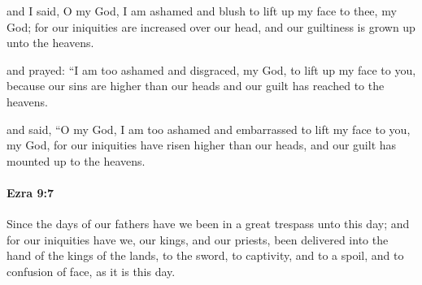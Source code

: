 			\begin{versebox}
					\item[BHS] 
					\item[LXX] 
					\item[ASV] and I said, O my God, I am ashamed and blush to lift up my face to thee, my God; for our iniquities are increased over our head, and our guiltiness is grown up unto the heavens.
					\item[NIV] and prayed: “I am too ashamed and disgraced, my God, to lift up my face to you, because our sins are higher than our heads and our guilt has reached to the heavens.
					\item[NRSV] and said, “O my God, I am too ashamed and embarrassed to lift my face to you, my God, for our iniquities have risen higher than our heads, and our guilt has mounted up to the heavens.
			\end{versebox}

		\paragraph{Ezra 9:7} %
			\label{EZRA-9-7}

			Since the days of our fathers have we been in a great trespass unto this day; and for our iniquities have we, our kings, and our priests, been delivered into the hand of the kings of the lands, to the sword, to captivity, and to a spoil, and to confusion of face, as it is this day.

